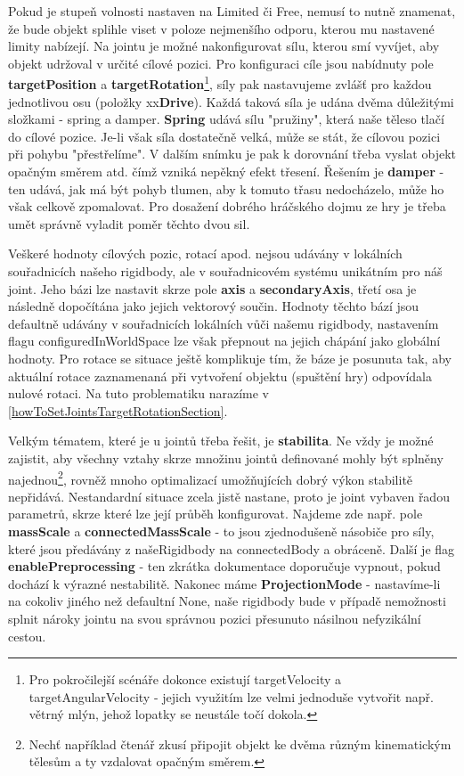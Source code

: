 Pokud je stupeň volnosti nastaven na Limited či Free, nemusí to nutně znamenat, že bude objekt splihle viset v poloze nejmenšího odporu, kterou mu nastavené limity nabízejí. Na jointu je možné nakonfigurovat sílu, kterou smí vyvíjet, aby objekt udržoval v určité cílové pozici. Pro konfiguraci cíle jsou nabídnuty pole \textbf{targetPosition} a \textbf{targetRotation}\footnote{Pro pokročilejší scénáře dokonce existují targetVelocity a targetAngularVelocity - jejich využitím lze velmi jednoduše vytvořit např. větrný mlýn, jehož lopatky se neustále točí dokola.}, síly pak nastavujeme zvlášť pro každou jednotlivou osu (položky xx\textbf{Drive}). Každá taková síla je udána dvěma důležitými složkami - spring a damper. \textbf{Spring} udává sílu "pružiny", která naše těleso tlačí do cílové pozice. Je-li však síla dostatečně velká, může se stát, že cílovou pozici při pohybu "přestřelíme". V dalším snímku je pak k dorovnání třeba vyslat objekt opačným směrem atd. čímž vzniká nepěkný efekt třesení. Řešením je \textbf{damper} - ten udává, jak má být pohyb tlumen, aby k tomuto třasu nedocházelo, může ho však celkově zpomalovat. Pro dosažení dobrého hráčského dojmu ze hry je třeba umět správně vyladit poměr těchto dvou sil.

Veškeré hodnoty cílových pozic, rotací apod. nejsou udávány v lokálních souřadnicích našeho rigidbody, ale v souřadnicovém systému unikátním pro náš joint. Jeho bázi lze nastavit skrze pole \textbf{axis} a \textbf{secondaryAxis}, třetí osa je následně dopočítána jako jejich vektorový součin. Hodnoty těchto bází jsou defaultně udávány v souřadnicích lokálních vůči našemu rigidbody, nastavením flagu configuredInWorldSpace lze však přepnout na jejich chápání jako globální hodnoty. Pro rotace se situace ještě komplikuje tím, že báze je posunuta tak, aby aktuální rotace zaznamenaná při vytvoření objektu (spuštění hry) odpovídala nulové rotaci. Na tuto problematiku narazíme v \ref{howToSetJointsTargetRotationSection}.

Velkým tématem, které je u jointů třeba řešit, je \textbf{stabilita}. Ne vždy je možné zajistit, aby všechny vztahy skrze množinu jointů definované mohly být splněny najednou\footnote{Nechť například čtenář zkusí připojit objekt ke dvěma různým kinematickým tělesům a ty vzdalovat opačným směrem.}, rovněž mnoho optimalizací umožňujících dobrý výkon stabilitě nepřidává. Nestandardní situace zcela jistě nastane, proto je joint vybaven řadou parametrů, skrze které lze její průběh konfigurovat. Najdeme zde např. pole \textbf{massScale} a \textbf{connectedMassScale} - to jsou zjednodušeně násobiče pro síly, které jsou předávány z našeRigidbody na connectedBody a obráceně. Další je flag \textbf{enablePreprocessing} - ten zkrátka dokumentace doporučuje vypnout, pokud dochází k výrazné nestabilitě. Nakonec máme \textbf{ProjectionMode} - nastavíme-li na cokoliv jiného než defaultní None, naše rigidbody bude v případě nemožnosti splnit nároky jointu na svou správnou pozici přesunuto násilnou nefyzikální cestou. 

